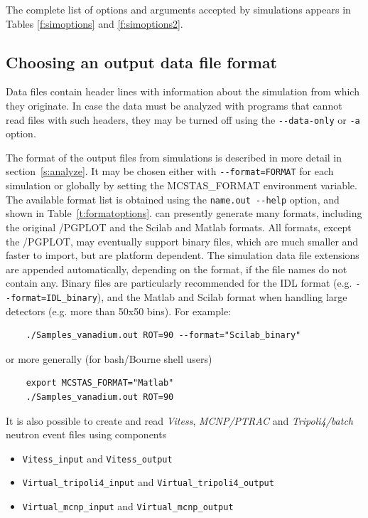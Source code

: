 The complete list of options
and arguments accepted by \MCS simulations appears in
Tables \ref{f:simoptions} and \ref{f:simoptions2}.

\subsection{Choosing an output data file format}

Data files contain header lines with information about the
simulation from which they originate. In case the data must be analyzed
with programs that cannot read files with such headers, they may be
turned off using the \verb+--data-only+ or \verb+-a+ option.

The format of the output files from \MCS simulations is described in
more detail in section~\ref{s:analyze}. It may be chosen either with \verb+--format=FORMAT+ for each simulation or globally by setting the MCSTAS\_FORMAT environment variable. 
The available format list is obtained using the \verb+name.out --help+ option, and shown in Table~\ref{t:formatoptions}.      
\MCS can presently generate many formats, including the original \MCS /PGPLOT and the Scilab and Matlab formats. All formats, except the \MCS /PGPLOT, may eventually support binary files, which are much smaller and faster to import, but are platform dependent. The simulation data file extensions are appended automatically, depending on the format, if the file names do not contain any. Binary files are particularly recommended for the IDL format (e.g. \verb+--format=IDL_binary+), and the Matlab and Scilab format when handling large detectors (e.g. more than 50x50 bins). For example:
\begin{lstlisting}
    ./Samples_vanadium.out ROT=90 --format="Scilab_binary"
\end{lstlisting}
or more generally (for bash/Bourne shell users)
\begin{lstlisting}
    export MCSTAS_FORMAT="Matlab"
    ./Samples_vanadium.out ROT=90
\end{lstlisting}

It is also possible to create and read \textit{Vitess}, \textit{MCNP/PTRAC} and \textit{Tripoli4/batch}
neutron event files using components
\begin{itemize}
\item \verb+Vitess_input+ and \verb+Vitess_output+
\item \verb+Virtual_tripoli4_input+ and \verb+Virtual_tripoli4_output+
\item \verb+Virtual_mcnp_input+ and \verb+Virtual_mcnp_output+
\end{itemize}  

